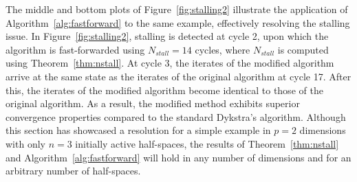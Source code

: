 The middle and bottom plots of Figure~\ref{fig:stalling2} illustrate the application of Algorithm~\ref{alg:fastforward} to the same example, effectively resolving the stalling issue. In Figure~\ref{fig:stalling2}, stalling is detected at cycle 2, upon which the algorithm is fast-forwarded using $N_{stall}=14$ cycles, where $N_{stall}$ is computed using Theorem~\ref{thm:nstall}. At cycle 3, the iterates of the modified algorithm arrive at the same state as the iterates of the original algorithm at cycle 17. After this, the iterates of the modified algorithm become identical to those of the original algorithm. As a result, the modified method exhibits superior convergence properties compared to the standard Dykstra's algorithm. Although this section has showcased a resolution for a simple example in $p = 2$ dimensions with only $n=3$ initially active half-spaces, the results of Theorem~\ref{thm:nstall} and Algorithm~\ref{alg:fastforward} will hold in any number of dimensions and for an arbitrary number of half-spaces.


